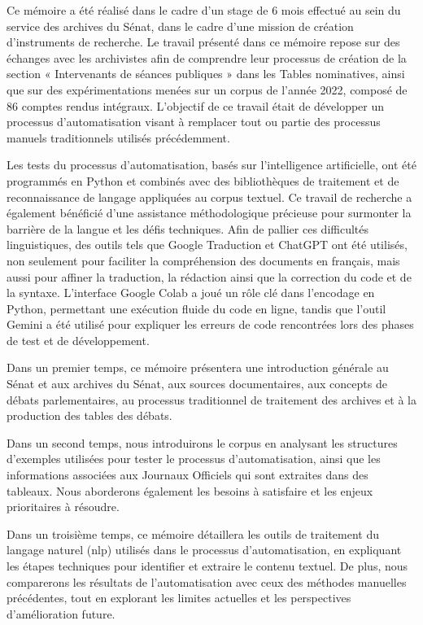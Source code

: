 Ce mémoire a été réalisé dans le cadre d'un stage de 6 mois effectué au sein du service des archives du Sénat, dans le cadre d'une mission de création d'instruments de recherche. Le travail présenté dans ce mémoire repose sur des échanges avec les archivistes afin de comprendre leur processus de création de la section « Intervenants de séances publiques » dans les Tables nominatives, ainsi que sur des expérimentations menées sur un corpus de l'année 2022, composé de 86 comptes rendus intégraux. L'objectif de ce travail était de développer un processus d’automatisation visant à remplacer tout ou partie des processus manuels traditionnels utilisés précédemment.

Les tests du processus d'automatisation, basés sur l'intelligence artificielle, ont été programmés en Python et combinés avec des bibliothèques de traitement et de reconnaissance de langage appliquées au corpus textuel. Ce travail de recherche a également bénéficié d’une assistance méthodologique précieuse pour surmonter la barrière de la langue et les défis techniques. Afin de pallier ces difficultés linguistiques, des outils tels que Google Traduction et \gls{ChatGPT} ont été utilisés, non seulement pour faciliter la compréhension des documents en français, mais aussi pour affiner la traduction, la rédaction ainsi que la correction du code et de la syntaxe. L’interface Google Colab a joué un rôle clé dans l’encodage en Python, permettant une exécution fluide du code en ligne, tandis que l’outil Gemini a été utilisé pour expliquer les erreurs de code rencontrées lors des phases de test et de développement.

Dans un premier temps, ce mémoire présentera une introduction générale au Sénat et aux archives du Sénat, aux sources documentaires, aux concepts de débats parlementaires, au processus traditionnel de traitement des archives et à la production des tables des débats.

Dans un second temps, nous introduirons le corpus en analysant les structures d'exemples utilisées pour tester le processus d'automatisation, ainsi que les informations associées aux Journaux Officiels qui sont extraites dans des tableaux. Nous aborderons également les besoins à satisfaire et les enjeux prioritaires à résoudre.

Dans un troisième temps, ce mémoire détaillera les outils de traitement du langage naturel (\gls{nlp}) utilisés dans le processus d'automatisation, en expliquant les étapes techniques pour identifier et extraire le contenu textuel. De plus, nous comparerons les résultats de l'automatisation avec ceux des méthodes manuelles précédentes, tout en explorant les limites actuelles et les perspectives d'amélioration future.
